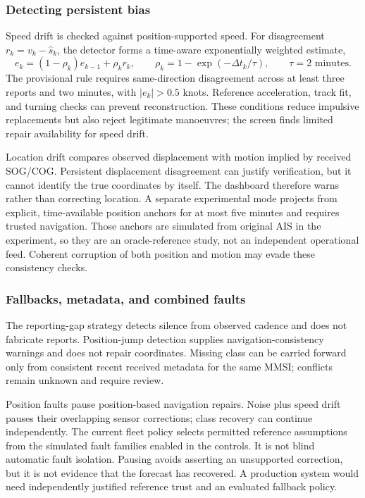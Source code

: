 \documentclass[11pt]{article}
\begin{document}
\subsubsection{Detecting persistent bias}
Speed drift is checked against position-supported speed. For disagreement $r_k=v_k-\widehat s_k$, the detector forms a time-aware exponentially weighted estimate,
\[
 e_k=(1-\rho_k)e_{k-1}+\rho_k r_k,\qquad
 \rho_k=1-\exp(-\Delta t_k/\tau),\qquad \tau=2\text{ minutes}.
\]
The provisional rule requires same-direction disagreement across at least three reports and two minutes, with $|e_k|>0.5$ knots. Reference acceleration, track fit, and turning checks can prevent reconstruction. These conditions reduce impulsive replacements but also reject legitimate manoeuvres; the screen finds limited repair availability for speed drift.

Location drift compares observed displacement with motion implied by received SOG/COG. Persistent displacement disagreement can justify verification, but it cannot identify the true coordinates by itself. The dashboard therefore warns rather than correcting location. A separate experimental mode projects from explicit, time-available position anchors for at most five minutes and requires trusted navigation. Those anchors are simulated from original AIS in the experiment, so they are an oracle-reference study, not an independent operational feed. Coherent corruption of both position and motion may evade these consistency checks.

\subsubsection{Fallbacks, metadata, and combined faults}
The reporting-gap strategy detects silence from observed cadence and does not fabricate reports. Position-jump detection supplies navigation-consistency warnings and does not repair coordinates. Missing class can be carried forward only from consistent recent received metadata for the same MMSI; conflicts remain unknown and require review.

Position faults pause position-based navigation repairs. Noise plus speed drift pauses their overlapping sensor corrections; class recovery can continue independently. The current fleet policy selects permitted reference assumptions from the simulated fault families enabled in the controls. It is not blind automatic fault isolation. Pausing avoids asserting an unsupported correction, but it is not evidence that the forecast has recovered. A production system would need independently justified reference trust and an evaluated fallback policy.
\end{document}
